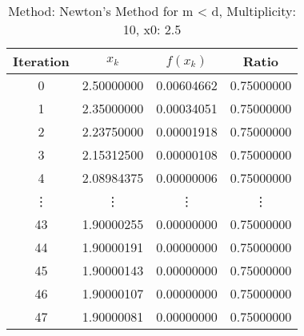 \begin{table}
\centering
\caption{Method: Newton's Method for m < d, Multiplicity: 10, x0: 2.5}
\label{tab:table_Newton's_Method_for_m_<_d_10_2_5}
\begin{tabular}{c c c c}
\toprule
Iteration &      $x_k$ &   $f(x_k)$ &      Ratio \\
\midrule
        0 & 2.50000000 & 0.00604662 & 0.75000000 \\
        1 & 2.35000000 & 0.00034051 & 0.75000000 \\
        2 & 2.23750000 & 0.00001918 & 0.75000000 \\
        3 & 2.15312500 & 0.00000108 & 0.75000000 \\
        4 & 2.08984375 & 0.00000006 & 0.75000000 \\
   \vdots &     \vdots &     \vdots &     \vdots \\
       43 & 1.90000255 & 0.00000000 & 0.75000000 \\
       44 & 1.90000191 & 0.00000000 & 0.75000000 \\
       45 & 1.90000143 & 0.00000000 & 0.75000000 \\
       46 & 1.90000107 & 0.00000000 & 0.75000000 \\
       47 & 1.90000081 & 0.00000000 & 0.75000000 \\
\bottomrule
\end{tabular}
\end{table}
